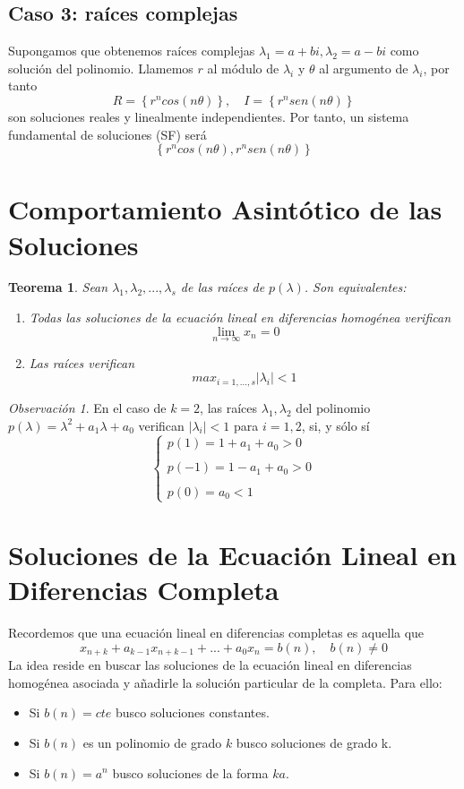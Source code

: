 \documentclass[a4paper, 12pt]{article}
\theoremstyle{plain}
\newtheorem{teorema}{Teorema}[section]
\theoremstyle{definition}
\theoremstyle{remark}
\newtheorem*{observacion}{Observación}
\begin{document}
	\subsection{Caso 3: raíces complejas}
	Supongamos que obtenemos raíces complejas $\lambda_1=a+bi, \lambda_2=a-bi$ como solución del polinomio. Llamemos $r$ al módulo de $\lambda_i$ y $\theta$ al argumento de $\lambda_i$, por tanto
	\[R=\left\{r^ncos(n\theta)\right\}, \quad I=\left\{r^nsen(n\theta)\right\}\]
	son soluciones reales y linealmente independientes. Por tanto, un sistema fundamental de soluciones (SF) será
	\[\left\{r^ncos(n\theta),r^nsen(n\theta)\right\}\]
	
	\section{Comportamiento Asintótico de las Soluciones}
	\begin{teorema}\label{comportamiento}
		Sean $\lambda_1,\lambda_2,...,\lambda_s$ de las raíces de $p(\lambda)$. Son equivalentes:
		\begin{enumerate}
			\item Todas las soluciones de la ecuación lineal en diferencias homogénea verifican
			\[\lim_{n\rightarrow \infty}x_n = 0\]
			\item Las raíces verifican
			\[max_{i=1,...,s} |\lambda_i|<1\]
		\end{enumerate}
	\end{teorema}
	\begin{observacion}
		En el caso de $k=2$, las raíces $\lambda_1,\lambda_2$ del polinomio $p(\lambda)=\lambda^2+a_1\lambda+a_0$ verifican $|\lambda_i|<1$ para $i=1,2$, si, y sólo sí
		\[\left\{ \begin{array}{lcc}
		p(1)=1+a_1+a_0>0 \\
		\\ p(-1)=1-a_1+a_0>0 \\
		\\ p(0)=a_0<1  
		\end{array}
		\right.\]
	\end{observacion}

	\section{Soluciones de la Ecuación Lineal en Diferencias Completa}
	Recordemos que una ecuación lineal en diferencias completas es aquella que 
	\[x_{n+k}+a_{k-1}x_{n+k-1}+...+a_0x_n=b(n), \quad b(n)\neq 0\]
	La idea reside en buscar las soluciones de la ecuación lineal en diferencias homogénea asociada y añadirle la solución particular de la completa. Para ello:
	\begin{itemize}
		\item Si $b(n)=cte$ busco soluciones constantes.
		\item Si $b(n)$ es un polinomio de grado $k$ busco soluciones de grado k.
		\item Si $b(n)=a^n$ busco soluciones de la forma $ka$.
	\end{itemize}
\end{document}
